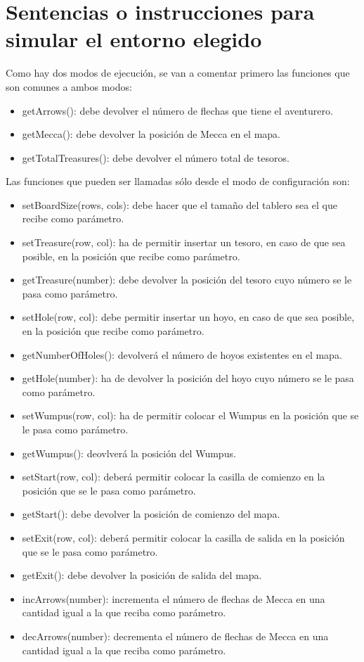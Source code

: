 \documentclass[a4paper,12pt,twoside,openright]{report}
\begin{document}
  \section{Sentencias o instrucciones para simular el entorno elegido}
  Como hay dos modos de ejecución, se van a comentar primero las funciones que son comunes a ambos modos:
  \begin{itemize}
   \item getArrows(): debe devolver el número de flechas que tiene el aventurero.
   \item getMecca(): debe devolver la posición de Mecca en el mapa.
   \item getTotalTreasures(): debe devolver el número total de tesoros.
  \end{itemize}
  Las funciones que pueden ser llamadas sólo desde el modo de configuración son:
  \begin{itemize}
   \item setBoardSize(rows, cols): debe hacer que el tamaño del tablero sea el que recibe como parámetro.
   \item setTreasure(row, col): ha de permitir insertar un tesoro, en caso de que sea posible, en la posición que recibe como 
   parámetro.
   \item getTreasure(number): debe devolver la posición del tesoro cuyo número se le pasa como parámetro.
   \item setHole(row, col): debe permitir insertar un hoyo, en caso de que sea posible, en la posición que recibe como 
   parámetro.
   \item getNumberOfHoles(): devolverá el número de hoyos existentes en el mapa.
   \item getHole(number): ha de devolver la posición del hoyo cuyo número se le pasa como parámetro.
   \item setWumpus(row, col): ha de permitir colocar el Wumpus en la posición que se le pasa como parámetro.
   \item getWumpus(): deovlverá la posición del Wumpus.
   \item setStart(row, col): deberá permitir colocar la casilla de comienzo en la posición que se le pasa como parámetro.
   \item getStart(): debe devolver la posición de comienzo del mapa.
   \item setExit(row, col): deberá permitir colocar la casilla de salida en la posición que se le pasa como parámetro.
   \item getExit(): debe devolver la posición de salida del mapa.
   \item incArrows(number): incrementa el número de flechas de Mecca en una cantidad igual a la que reciba como parámetro.
   \item decArrows(number): decrementa el número de flechas de Mecca en una cantidad igual a la que reciba como parámetro.
  \end{itemize}
\end{document}
